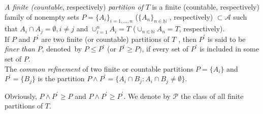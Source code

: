 \documentclass[11pt,a4paper,twoside]{amsart}
\begin{document}
 \textit{A finite (countable}, respectively) 
\textit{partition of} $T$ is a finite (countable, respectively) family of
nonempty sets $P=\{A_{i}\}_{i=1, \ldots, n}$ ($\{A_{n}\}_{n\in \mathbb{N}}$
, respectively) $\subset \mathcal{A}$ such that $A_{i}\cap A_{j}=\emptyset
,i\neq j$ and $\cup_{i=1}^{n} A_{i}=T$ ($\cup_{n\in 
\mathbb{N}}A_{n}=T$, respectively). \\
 If $P$ and $P^{\prime }$ are two finite (or countable) partitions of $T$
, then $P^{\prime }$ is said to be \textit{finer than} $P$, denoted\ by $
P\leq P^{\prime }$ (or $P^{\prime }\geq P)$, if every set of $P^{\prime }$
is included in some set of $P$.\\
  The \textit{common refinement} of two finite or countable partitions $
P=\{A_{i}\}$ and $P^{\prime }=\{B_{j}\}$ is the partition $P\wedge P^{\prime
}=\{A_{i}\cap B_{j}: A_{i}\cap B_{j}\neq\emptyset\}$.

Obviously, $P\wedge P^{\prime }\geq P$ and $P\wedge P^{\prime }\geq
P^{\prime }.$ We denote by $\mathcal{P}$ the class of all finite partitions
of $T$.
\end{document}
